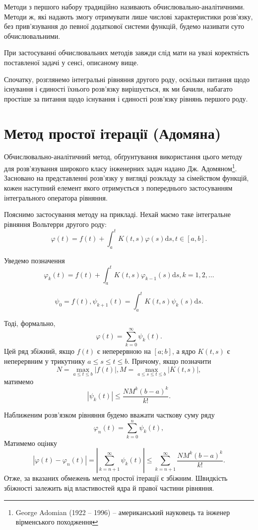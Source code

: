 \documentclass[14pt,twoside]{extreport}
\theoremstyle{mystyle}
\numberwithin{equation}{chapter}
\begin{document}
Методи з першого набору традиційно називають обчислювально-аналітичними. Методи ж, які надають змогу отримувати лише числові характеристики розв'язку, без прив'язування до певної додаткової системи функцій, будемо називати суто обчислювальними.

При застосуванні обчислювальних методів завжди слід мати на увазі коректність поставленої задачі у сенсі, описаному вище.

Спочатку, розглянемо інтегральні рівняння другого роду, оскільки питання щодо існування і єдиності їхнього розв'язку вирішується, як ми бачили, набагато простіше за питання щодо існування і єдиності розв'язку рівнянь першого роду.

\section{Метод простої ітерації (Адомяна)}

Обчислювально-аналітичний метод, обґрунтування використання цього методу для розв'язування широкого класу інженерних задач надано Дж. Адомяном\footnote{George Adomian (1922 -- 1996) -- американський науковець та інженер вірменського походження}. Засновано на представленні розв'язку у вигляді розкладу за сімейством функцій, кожен наступний елемент якого отримується з попереднього застосуванням інтегрального оператора рівняння.

Пояснимо застосування методу на прикладі. Нехай маємо таке інтегральне рівняння Вольтерри другого роду:
\[
\varphi(t)=f(t)+\displaystyle \int_{a}^{t}K(t,s)\varphi(s)\mathrm{d}s,t\in[a,b].
\]

Уведемо позначення
\[
\varphi_{k}(t)=f(t)+\displaystyle \int_{a}^{t}K(t,s)\varphi_{k-1}(s)\mathrm{d}s,k=1,2, \ldots
\]

\[
\psi_{0}=f(t),\psi_{k+1}(t)=\int_{a}^{t}K(t,s)\psi_{k}(s)\mathrm{d}s.
\]

Тоді, формально,
\[
\varphi(t)=\displaystyle \sum_{k=0}^{\infty}\psi_{k}(t).
\]
Цей ряд збіжний, якщо $f(t)$ є неперервною на $[a; b]$, а ядро $K(t, s)$ є неперервним у трикутнику $a \leqslant s \leqslant t \leqslant b$. Причому, якщо позначити
\[
N=\max\limits_{a\leqslant t \leqslant b} |f(t)|, M=\max\limits_{a\leqslant s \leqslant t \leqslant b}|K(t,s)|,
\]
матимемо
\[
|\psi_{k}(t)|\leqslant\frac{NM^{k}(b-a)^{k}}{k!}.
\]

Наближеним розв'язком рівняння будемо вважати часткову суму ряду
\[
\varphi_{n}(t)=\sum\limits_{k=0}^{n}\psi_{k}(t),
\]
Матимемо оцінку
\[
|\varphi(t)-\varphi_{n}(t)|=\left|\sum_{k=n+1}^{\infty}\psi_{k}(t)\right|\leqslant\sum_{k=n+1}^{\infty}\frac{NM^{k}(b-a)^{k}}{k!}.
\]
Отже, за вказаних обмежень метод простої ітерації є збіжним. Швидкість збіжності залежить від властивостей ядра й правої частини рівняння.
\end{document}
